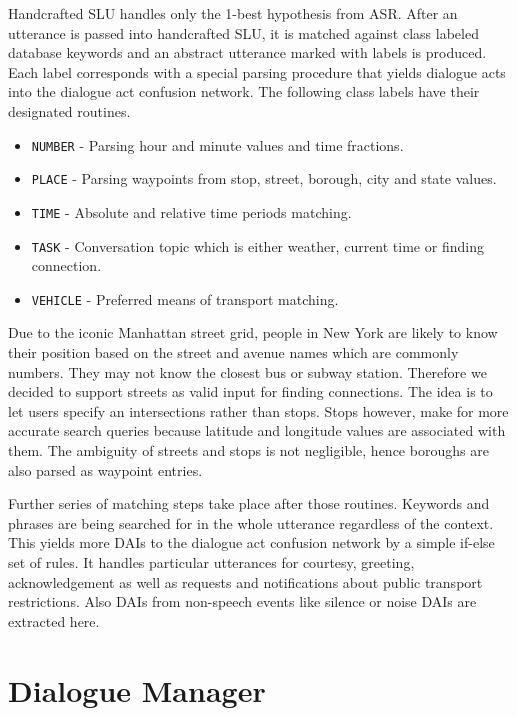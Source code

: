 Handcrafted SLU handles only the 1-best hypothesis from ASR.
After an utterance is passed into handcrafted SLU, it is matched against class labeled database keywords and an abstract utterance marked with labels is produced.
Each label corresponds with a special parsing procedure that yields dialogue acts into the dialogue act confusion network.
The following class labels have their designated routines.

\begin{itemize}
	\item \texttt{NUMBER} - Parsing hour and minute values and time fractions.
	\item \texttt{PLACE} - Parsing waypoints from stop, street, borough, city and state values.
	\item \texttt{TIME} - Absolute and relative time periods matching.
	\item \texttt{TASK} - Conversation topic which is either weather, current time or finding connection.
	\item \texttt{VEHICLE} - Preferred means of transport matching.
\end{itemize}

Due to the iconic Manhattan street grid, people in New York are likely to know their position based on the street and avenue names which are commonly numbers.
They may not know the closest bus or subway station.
Therefore we decided to support streets as valid input for finding connections.
The idea is to let users specify an intersections rather than stops.
Stops however, make for more accurate search queries because latitude and longitude values are associated with them.
The ambiguity of streets and stops is not negligible, hence boroughs are also parsed as waypoint entries.

Further series of matching steps take place after those routines.
Keywords and phrases are being searched for in the whole utterance regardless of the context.
This yields more DAIs to the dialogue act confusion network by a simple if-else set of rules.
It handles particular utterances for courtesy, greeting, acknowledgement as well as requests and notifications about public transport restrictions.
Also DAIs from non-speech events like silence or noise DAIs are extracted here.

\section{Dialogue Manager}

